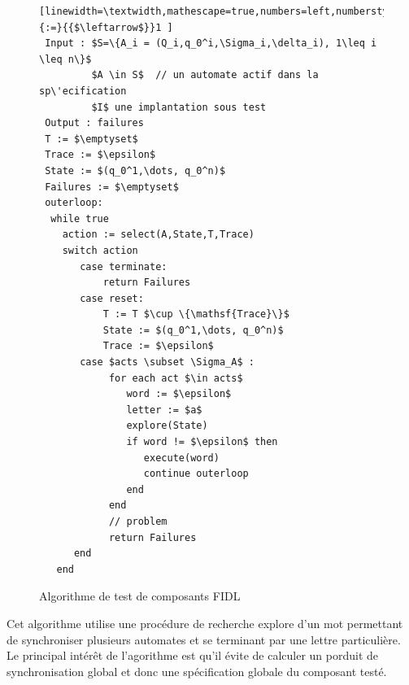 \begin{figure}[htbp]
    \centering
 \begin{lstlisting}[linewidth=\textwidth,mathescape=true,numbers=left,numberstyle=\tiny,literate={:=}{{$\leftarrow$}}1 ]
 Input : $S=\{A_i = (Q_i,q_0^i,\Sigma_i,\delta_i), 1\leq i \leq n\}$
         $A \in S$  // un automate actif dans la sp\'ecification
         $I$ une implantation sous test          
 Output : failures     
 T := $\emptyset$
 Trace := $\epsilon$ 
 State := $(q_0^1,\dots, q_0^n)$ 
 Failures := $\emptyset$
 outerloop:
  while true 
    action := select(A,State,T,Trace)
    switch action
       case terminate: 
           return Failures
       case reset:
           T := T $\cup \{\mathsf{Trace}\}$
           State := $(q_0^1,\dots, q_0^n)$
           Trace := $\epsilon$
       case $acts \subset \Sigma_A$ :
            for each act $\in acts$ 
               word := $\epsilon$
               letter := $a$
               explore(State) 
               if word != $\epsilon$ then
                  execute(word)
                  continue outerloop 
               end
            end
            // problem
            return Failures
      end  
   end 
 \end{lstlisting}
 \caption{Algorithme de test de composants \textsf{FIDL}}
 \label{fig-algo-test-fidl}
 \end{figure}

Cet algorithme utilise une proc\'edure de recherche \textsf{explore} d'un mot
permettant de synchroniser plusieurs automates et se terminant par une
lettre particuli\`ere. Le principal int\'er\^et de l'agorithme est
qu'il \'evite de calculer un porduit de synchronisation global et
donc une sp\'ecification globale du composant test\'e.

